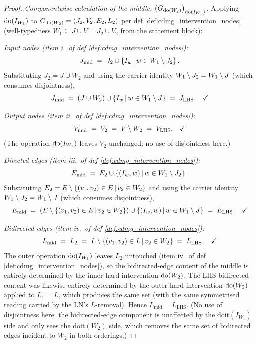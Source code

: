 \documentclass[main]{subfiles}
\begin{document}
\begin{proof}
\smallskip\noindent\emph{Componentwise calculation of the middle, $\left ( G_{\operatorname{do}(W_2)} \right )_{\operatorname{do}(I_{W_1})}$.}
Applying $\operatorname{do}(I_{W_1})$ to $G_{\operatorname{do}(W_2)} = (J_2, V_2, E_2, L_2)$ per def \ref{def:cdmg_intervention_nodes} (well-typedness $W_1 \subseteq J \cup V = J_2 \cup V_2$ from the statement block):

\medskip\noindent\emph{Input nodes (item i.\ of def \ref{def:cdmg_intervention_nodes}):}
\[
    J_{\mathrm{mid}} \;=\; J_2 \cup \left \{ I_w \,\middle|\, w \in W_1 \setminus J_2 \right \}.
\]
Substituting $J_2 = J \cup W_2$ and using the carrier identity $W_1 \setminus J_2 = W_1 \setminus J$ (which consumes disjointness),
\[
    J_{\mathrm{mid}} \;=\; (J \cup W_2) \cup \left \{ I_w \,\middle|\, w \in W_1 \setminus J \right \} \;=\; J_{\mathrm{LHS}}. \quad \checkmark
\]

\medskip\noindent\emph{Output nodes (item ii.\ of def \ref{def:cdmg_intervention_nodes}):}
\[
    V_{\mathrm{mid}} \;=\; V_2 \;=\; V \setminus W_2 \;=\; V_{\mathrm{LHS}}. \quad \checkmark
\]
(The operation $\operatorname{do}(I_{W_1})$ leaves $V_2$ unchanged; no use of disjointness here.)

\medskip\noindent\emph{Directed edges (item iii.\ of def \ref{def:cdmg_intervention_nodes}):}
\[
    E_{\mathrm{mid}} \;=\; E_2 \cup \left \{ (I_w, w) \,\middle|\, w \in W_1 \setminus J_2 \right \}.
\]
Substituting $E_2 = E \setminus \left \{ (v_1, v_2) \in E \,\middle|\, v_2 \in W_2 \right \}$ and using the carrier identity $W_1 \setminus J_2 = W_1 \setminus J$ (which consumes disjointness),
\[
    E_{\mathrm{mid}} \;=\; \left ( E \setminus \left \{ (v_1, v_2) \in E \,\middle|\, v_2 \in W_2 \right \} \right ) \cup \left \{ (I_w, w) \,\middle|\, w \in W_1 \setminus J \right \} \;=\; E_{\mathrm{LHS}}. \quad \checkmark
\]

\medskip\noindent\emph{Bidirected edges (item iv.\ of def \ref{def:cdmg_intervention_nodes}):}
\[
    L_{\mathrm{mid}} \;=\; L_2 \;=\; L \setminus \left \{ (v_1, v_2) \in L \,\middle|\, v_2 \in W_2 \right \} \;=\; L_{\mathrm{LHS}}. \quad \checkmark
\]
The outer operation $\operatorname{do}(I_{W_1})$ leaves $L_2$ untouched (item iv.\ of def \ref{def:cdmg_intervention_nodes}), so the bidirected-edge content of the middle is entirely determined by the inner hard intervention $\operatorname{do}(W_2)$. The LHS bidirected content was likewise entirely determined by the outer hard intervention $\operatorname{do}(W_2)$ applied to $L_1 = L$, which produces the same set (with the same symmetrised reading carried by the LN's $L$-removal). Hence $L_{\mathrm{mid}} = L_{\mathrm{LHS}}$. (No use of disjointness here: the bidirected-edge component is unaffected by the doit$(I_{W_1})$ side and only sees the doit$(W_2)$ side, which removes the same set of bidirected edges incident to $W_2$ in both orderings.)


\end{proof}
\end{document}
